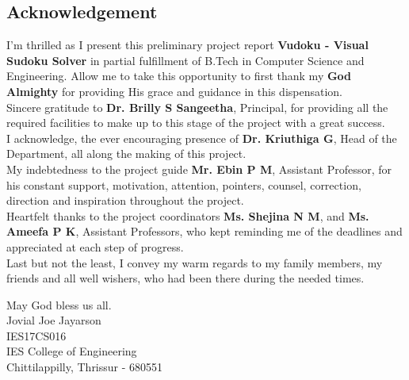 \documentclass[12pt, a4paper]{report}
\begin{document}
\newpage
\vspace*{\fill}
\begin{center}
    \section*{\centering \huge Acknowledgement}
\end{center}

\noindent I'm thrilled as I present this preliminary project report \textbf{Vudoku - Visual Sudoku Solver} in partial fulfillment of B.Tech in Computer Science and Engineering. Allow me to take this opportunity to first thank my \textbf{God Almighty} for providing His grace and guidance in this dispensation.\\

\noindent Sincere gratitude to \textbf{Dr. Brilly S Sangeetha}, Principal, for providing all the required facilities to make up to this stage of the project with a great success.\\

\noindent I acknowledge, the ever encouraging presence of \textbf{Dr. Kriuthiga G}, Head of the Department, all along the making of this project.\\

\noindent My indebtedness to the project guide \textbf{Mr. Ebin P M}, Assistant Professor, for his constant support, motivation, attention, pointers, counsel, correction, direction and inspiration throughout the project.\\

\noindent Heartfelt thanks to the project coordinators \textbf{Ms. Shejina N M}, and \textbf{Ms. Ameefa P K}, Assistant Professors, who kept reminding me of the deadlines and appreciated at each step of progress.\\

\noindent Last but not the least, I convey my warm regards to my family members, my friends and all well wishers, who had been there during the needed times.\\

\begin{center}
    May God bless us all.\\[4cm]
    Jovial Joe Jayarson\\
    IES17CS016\\
    IES College of Engineering\\
    Chittilappilly, Thrissur - 680551
\end{center}
\vspace*{\fill}
\end{document}
